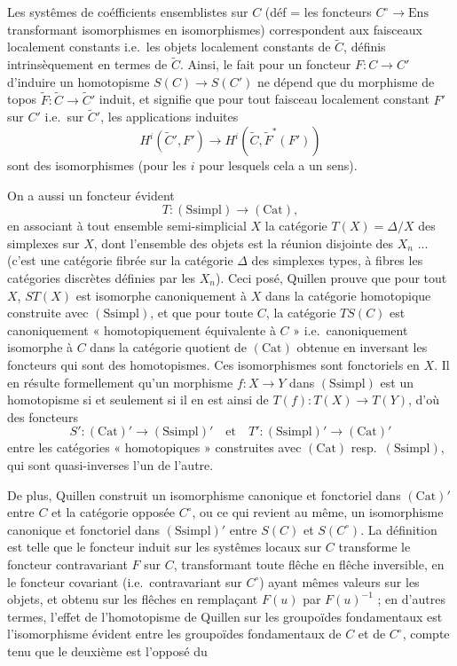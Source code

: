 \documentclass[11pt,a4paper]{article}
\begin{document}
Les systêmes de coéfficients ensemblistes sur $C$ (déf = les foncteurs
$C^{\circ} \to \mathrm{Ens}$ transformant isomorphismes en isomorphismes)
correspondent aux faisceaux localement constants i.e.\ les objets localement
constants de $\widetilde{C}$, définis intrinsèquement en termes de
$\widetilde{C}$. Ainsi, le fait pour un foncteur $F : C \to C'$ d'induire un
homotopisme $S(C) \to S(C')$ ne dépend que du morphisme de topos
$\widetilde{F} : \widetilde{C} \to \widetilde{C}'$ induit, et signifie que
pour tout faisceau localement constant $F'$ sur $C'$ i.e.\ sur
$\widetilde{C}'$, les applications induites
\[
H^{i}(\widetilde{C}', F') \longrightarrow H^{i}(\widetilde{C},
\widetilde{F}^{*}(F'))
\]
sont des isomorphismes (pour les $i$ pour lesquels cela a un sens).


On a aussi un foncteur évident
\[
T : (\mathrm{Ssimpl}) \longrightarrow (\mathrm{Cat}) ,
\]
en associant à tout ensemble semi-simplicial $X$ la catégorie $T(X) =
\Delta/X$ des simplexes sur $X$, dont l'ensemble des objets est la réunion
disjointe des $X_{n}$ ... (c'est une catégorie fibrée sur la catégorie
$\Delta$ des simplexes types, à fibres les catégories discrètes définies par
les $X_{n}$). Ceci posé, Quillen prouve que pour tout $X$, $ST(X)$ est
isomorphe canoniquement à $X$ dans la catégorie homotopique construite avec
$(\mathrm{Ssimpl})$, et que pour toute $C$, la catégorie $TS(C)$ est
canoniquement « homotopiquement équivalente à $C$ » i.e.\ canoniquement isomorphe à $C$ dans
la catégorie quotient de $(\mathrm{Cat})$ obtenue en inversant les foncteurs
qui sont des homotopismes. Ces isomorphismes sont fonctoriels en $X$. Il en
résulte formellement qu'un morphisme $f : X \to Y$ dans $(\mathrm{Ssimpl})$
est un homotopisme si et seulement si il en est ainsi de $T(f) : T(X) \to
T(Y)$, d'où des foncteurs
\[
S' : (\mathrm{Cat})' \to (\mathrm{Ssimpl})' \quad\text{et}\quad T' :
(\mathrm{Ssimpl})' \to (\mathrm{Cat})'
\]
entre les catégories « homotopiques » construites avec $(\mathrm{Cat})$ resp.\
$(\mathrm{Ssimpl})$, qui sont quasi-inverses l'un de l'autre.

De plus, Quillen construit un isomorphisme canonique et fonctoriel dans
$(\mathrm{Cat})'$ entre $C$ et la catégorie opposée $C^{\circ}$, ou ce qui
revient au même, un isomorphisme canonique et fonctoriel dans
$(\mathrm{Ssimpl})'$ entre $S(C)$ et $S(C^{\circ})$. La définition est telle
que le foncteur induit sur les systêmes locaux sur $C$ transforme le foncteur
contravariant $F$ sur $C$, transformant toute flêche en flêche inversible, en
le foncteur covariant (i.e.\ contravariant sur $C^{\circ}$) ayant mêmes
valeurs sur les objets, et obtenu sur les flêches en remplaçant $F(u)$ par
$F(u)^{-1}$ ; en d'autres termes, l'effet de l'homotopisme de Quillen sur les
groupoïdes fondamentaux est l'isomorphisme évident entre les groupoïdes
fondamentaux de $C$ et de $C^{\circ}$, compte tenu que le deuxième est
l'opposé du
\end{document}
